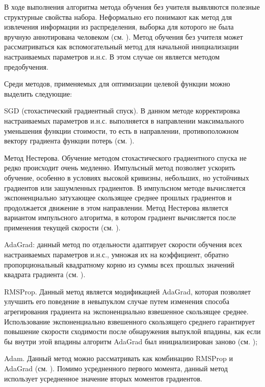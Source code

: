 В ходе выполнения алгоритма метода обучения без учителя выявляются полезные структурные свойства
набора. Неформально его понимают как метод для извлечения информации из распределения, выборка для которого
не была вручную аннотирована человеком (см. ). Метод обучения без учителя может рассматриваться как вспомогательный метод для начальной инициализации настраиваемых параметров и.н.с. В этом случае он является методом предобучения.

Среди методов, применяемых для оптимизации целевой функции можно выделить следующие:

\begin{textitemize}
	\item SGD (стохастический градиентный спуск). В данном методе корректировка настраиваемых параметров и.н.с. выполняется в направлении максимального уменьшения функции стоимости, то есть в направлении, противоположном вектору градиента функции потерь (см. ).
	\item Метод Нестерова. Обучение методом стохастического градиентного спуска не редко происходит очень медленно. Импульсный метод позволяет ускорить обучение, особенно в условиях высокой кривизны, небольших, но устойчивых градиентов или зашумленных градиентов. В импульсном методе вычисляется экспоненциально затухающее скользящее среднее прошлых градиентов и продолжается движение в этом направлении. Метод Нестерова является вариантом импульсного алгоритма, в котором градиент вычисляется после применения текущей скорости (см. ).
	\item AdaGrad: данный метод по отдельности адаптирует скорости обучения всех настраиваемых параметров и.н.с., умножая их на коэффициент, обратно пропорциональный квадратному корню из суммы всех прошлых значений квадрата градиента (см. ).
	\item RMSProp. Данный метод является модификацией AdaGrad, которая позволяет улучшить его поведение в невыпуклом случае путем изменения способа агрегирования градиента на экспоненциально взвешенное скользящее среднее. Использование экспоненциально взвешенного скользящего среднего гарантирует повышение скорости сходимости после обнаружения выпуклой впадины, как если бы внутри этой впадины алгоритм AdaGrad был инициализирован заново (см. );
	\item Adam. Данный метод можно рассматривать как комбинацию RMSProp и AdaGrad (см. ). Помимо усредненного первого момента, данный метод использует усредненное значение вторых моментов градиентов.
\end{textitemize}

